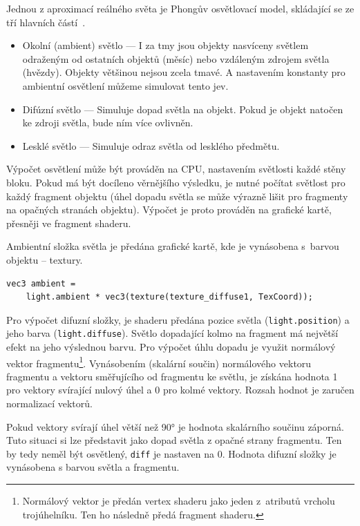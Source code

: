 \documentclass[thesis=M,czech]{FITthesis}[2019/12/23]
\begin{document}
Jednou z aproximací reálného světa je Phongův osvětlovací model, skládající se ze tří hlavních částí~\cite{lopgl_basic_light}.

\begin{itemize}
\item Okolní (ambient) světlo --- I za tmy jsou objekty nasvíceny světlem odraženým od ostatních objektů (měsíc) nebo vzdáleným zdrojem světla (hvězdy). Objekty většinou nejsou zcela tmavé. A nastavením konstanty pro ambientní osvětlení můžeme simulovat tento jev.

\item Difúzní světlo --- Simuluje dopad světla na objekt. Pokud je objekt natočen ke zdroji světla, bude ním více ovlivněn. 

\item Lesklé světlo --- Simuluje odraz světla od lesklého předmětu.
\end{itemize}

Výpočet osvětlení může být prováděn na CPU, nastavením světlosti každé stěny bloku. Pokud má být docíleno věrnějšího výsledku, je nutné počítat světlost pro každý fragment objektu (úhel dopadu světla se může výrazně lišit pro fragmenty na opačných stranách objektu). Výpočet je proto prováděn na grafické kartě, přesněji ve fragment shaderu.

Ambientní složka světla je předána grafické kartě, kde je vynásobena s~barvou objektu -- textury.

\begin{verbatim}
vec3 ambient = 
    light.ambient * vec3(texture(texture_diffuse1, TexCoord));
\end{verbatim}

Pro výpočet difuzní složky, je shaderu předána pozice světla (\texttt{light.position}) a jeho barva (\texttt{light.diffuse}). Světlo dopadající kolmo na fragment má největší efekt na jeho výslednou barvu. Pro výpočet úhlu dopadu je využit normálový vektor fragmentu\footnote{Normálový vektor je předán vertex shaderu jako jeden z~atributů vrcholu trojúhelníku. Ten ho následně předá fragment shaderu.}. Vynásobením (skalární součin) normálového vektoru fragmentu a vektoru směřujícího od fragmentu ke světlu, je získána hodnota 1 pro vektory svírající nulový úhel a 0 pro kolmé vektory. Rozsah hodnot je zaručen normalizací vektorů.

Pokud vektory svírají úhel větší než 90° je hodnota skalárního součinu záporná. Tuto situaci si lze představit jako dopad světla z opačné strany fragmentu. Ten by tedy neměl být osvětlený, \texttt{diff} je nastaven na 0. Hodnota difuzní složky je vynásobena s barvou světla a fragmentu.
\end{document}
